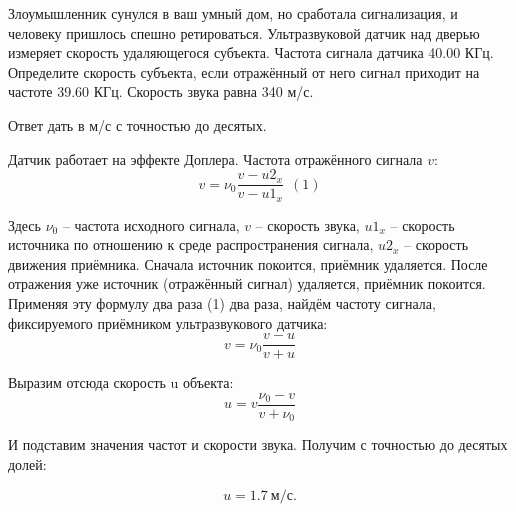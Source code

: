 
Злоумышленник сунулся в ваш умный дом, но сработала сигнализация, и человеку пришлось спешно ретироваться. Ультразвуковой датчик над дверью измеряет скорость удаляющегося субъекта. Частота сигнала датчика 40.00 КГц. Определите скорость субъекта, если отражённый от него сигнал приходит на частоте 39.60 КГц. Скорость звука равна 340 м/с.

Ответ дать в м/с с точностью до десятых.

\solutionSection

Датчик работает на эффекте Доплера. Частота отражённого 
сигнала $v$:
$$v=\nu_0 \frac{v-u2_x}{v-u1_x} \: \: (1)$$

Здесь $\nu_0$ – частота исходного сигнала, $v$ – скорость звука, 
$u1_x$ – скорость источника по отношению к среде 
распространения сигнала, $u2_x$ – скорость движения приёмника. Сначала источник покоится, 
приёмник удаляется. После отражения уже источник 
(отражённый сигнал) удаляется, приёмник покоится. 
Применяя эту формулу два раза (1) два раза, найдём частоту 
сигнала, фиксируемого приёмником ультразвукового датчика:
$$v=\nu_0 \frac{v-u}{v+u}$$

Выразим отсюда скорость u объекта:
$$u=v \frac{\nu_0-v}{v+\nu_0}$$

И подставим значения частот и скорости звука. Получим с 
точностью до десятых долей:

$$u=1.7 \: \text{м/с}.$$

